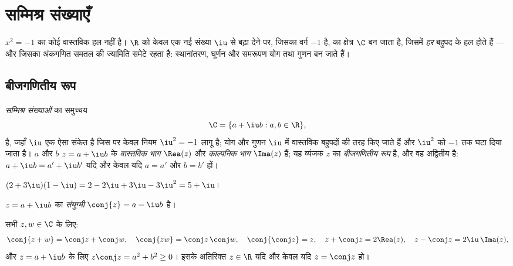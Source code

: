 \chapter{सम्मिश्र संख्याएँ}\label{ch:g12:complex}

 $x^2 = -1$ का कोई वास्तविक हल नहीं है। $\R$ को केवल एक नई संख्या $\iu$ से बढ़ा
देने पर, जिसका वर्ग $-1$ है,  का क्षेत्र $\C$ बन जाता है,
जिसमें \emph{हर} बहुपद  के हल होते हैं --- और जिसका अंकगणित समतल की
ज्यामिति समेटे रहता है: स्थानांतरण, घूर्णन और समरूपण योग तथा गुणन बन जाते
हैं।

\section{बीजगणितीय रूप}

\begin{definition}[सम्मिश्र संख्याएँ]\label{def:g12:complex:def}
\emph{सम्मिश्र संख्याओं} का समुच्चय
\[
\C = \{a + \iu b : a, b \in \R\},
\]
है, जहाँ $\iu$ एक ऐसा संकेत है जिस पर केवल नियम $\iu^2 = -1$ लागू है; योग और गुणन $\iu$
में वास्तविक बहुपदों की तरह किए जाते हैं और $\iu^2$ को $-1$ तक घटा दिया जाता है।
 $a$ और $b$ $z = a + \iu b$ के \emph{वास्तविक भाग}
$\Rea(z)$ और \emph{काल्पनिक भाग} $\Ima(z)$ हैं; यह व्यंजक $z$ का
\emph{बीजगणितीय रूप} है, और वह अद्वितीय है: $a + \iu b = a' + \iu b'$ यदि और
केवल यदि $a = a'$ और $b = b'$ हों।
\end{definition}

\begin{example}
$(2 + 3\iu)(1 - \iu) = 2 - 2\iu + 3\iu - 3\iu^2 = 5 + \iu$।
\end{example}

\begin{definition}[संयुग्मी]\label{def:g12:complex:conjugate}
$z = a + \iu b$ का \emph{संयुग्मी} $\conj{z} = a - \iu b$ है।
\end{definition}

\begin{proposition}[संयुग्मन के गुण]\label{prop:g12:complex:conjugate}
सभी $z, w \in \C$ के लिए:
\[
\conj{z + w} = \conj z + \conj w, \quad
\conj{zw} = \conj z\,\conj w, \quad
\conj{\conj z} = z, \quad
z + \conj z = 2\Rea(z), \quad
z - \conj z = 2\iu\,\Ima(z),
\]
और $z = a + \iu b$ के लिए $z\conj z = a^2 + b^2 \geq 0$। इसके अतिरिक्त $z \in \R$ यदि और केवल यदि $z = \conj z$ हो।
\end{proposition}

